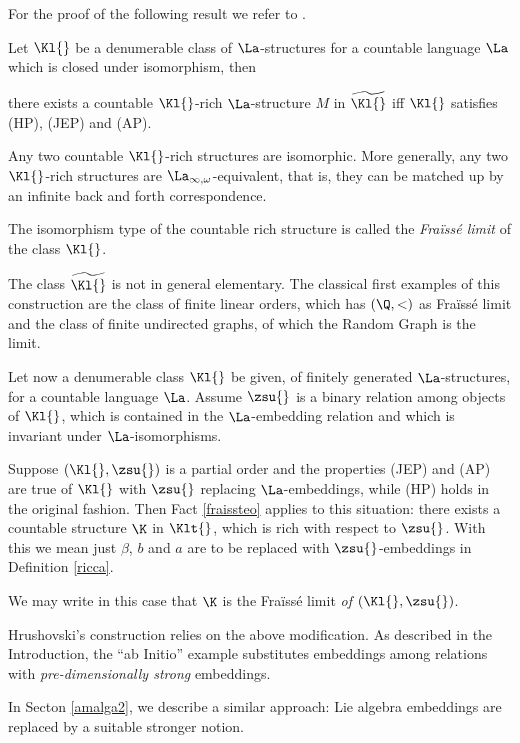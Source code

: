 For the proof of the following result we refer to \cite[Theorem 13.4]{zietent}.
\begin{fact}\label{fraissteo}
Let $\Kl{}$ be a denumerable class of $\La$-structures for a countable language $\La$ which is closed under isomorphism, then
\begin{itemize}
there exists a countable $\Kl{}$-rich $\La$-structure $M$ in $\widetilde{\Kl{}}$ iff
$\Kl{}$ satisfies \rm{(HP), (JEP)} and {\rm (AP)}.

Any two countable $\Kl{}$-rich structures are isomorphic. More generally, any two $\Kl{}$-rich structures
are $\La_{\infty,\omega}$-equivalent, that is, they can be matched up by an infinite back and forth correspondence.
\end{itemize}
\end{fact}
The isomorphism type of the countable rich structure is called the {\em Fra\"iss\'e limit} of the class $\Kl{}$.

The class $\widetilde{\Kl{}}$ is not in general elementary.
The classical first examples of this construction are
the class of finite linear orders, which has $(\Q,<)$ as Fra\"iss\'e limit and
the class of finite undirected graphs, of which the Random Graph is the limit.

\medskip
Let now a denumerable class $\Kl{}$ be given, of finitely generated $\La$-structures, for a countable language $\La$.
Assume $\zsu{}$ is a binary relation among objects of $\Kl{}$, which is contained in the $\La$-embedding relation
and which is invariant under $\La$-isomorphisms.

\begin{rem}\label{ModiFra}
Suppose $(\Kl{},\zsu{})$ is a partial order and the properties (JEP) and (AP) are true of $\Kl{}$ with $\zsu{}$
replacing $\La$-embeddings, while (HP) holds in the original fashion.
Then Fact \ref{fraissteo} applies to this situation: there exists a countable structure $\K$ in $\Klt{}$, which is rich with respect to $\zsu{}$.
With this we mean just $\beta$, $b$ and $a$ are to be replaced with $\zsu{}$-embeddings in
Definition \ref{ricca}.

We may write in this case that $\K$ is the Fra\"iss\'e limit {\em of} $(\Kl{},\zsu{})$.
\end{rem}

Hrushovski's construction relies on the above modification.
As described in the Introduction, the ``ab Initio'' example substitutes embeddings among relations
with {\em pre-dimensionally strong} embeddings.

In Secton \ref{amalga2}, we describe a similar approach: Lie algebra embeddings are replaced by a suitable
stronger notion.